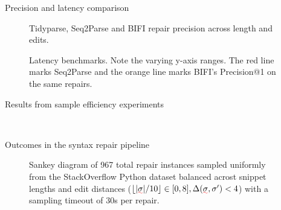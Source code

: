 \documentclass{beamer}
\begin{document}
\begin{frame}[fragile]{Precision and latency comparison}
\begin{figure}[h!]
\resizebox{.24\textwidth}{!}{}
\resizebox{.24\textwidth}{!}{}
\resizebox{.24\textwidth}{!}{}
\resizebox{.24\textwidth}{!}{}
\caption{Tidyparse, Seq2Parse and BIFI repair precision across length and edits.}
\end{figure}
\begin{figure}[h!]
\resizebox{.24\textwidth}{!}{}
\resizebox{.24\textwidth}{!}{}
\resizebox{.24\textwidth}{!}{}
\resizebox{.24\textwidth}{!}{}
\caption{Latency benchmarks. Note the varying y-axis ranges. The red line marks Seq2Parse and the orange line marks BIFI's Precision@1 on the same repairs.}\label{fig:human}
\end{figure}
\end{frame}

\begin{frame}[fragile]{Results from sample efficiency experiments}
\begin{figure}[h!]
\\
\resizebox{.35\textwidth}{!}{}\hspace{1cm}
\resizebox{.35\textwidth}{!}{}
\end{figure}
\end{frame}

\begin{frame}[fragile]{Outcomes in the syntax repair pipeline}
\vspace{-1cm}
\begin{figure}
\resizebox{.83\textwidth}{!}{}
\vspace{-1cm}
\caption{Sankey diagram of 967 total repair instances sampled uniformly from the StackOverflow Python dataset balanced acrost snippet lengths and edit distances ($\lfloor|\err\sigma| / 10\rfloor \in [0, 8], \Delta(\err\sigma, \sigma') < 4$) with a sampling timeout of 30s per repair.}
\end{figure}
\end{frame}
\end{document}
